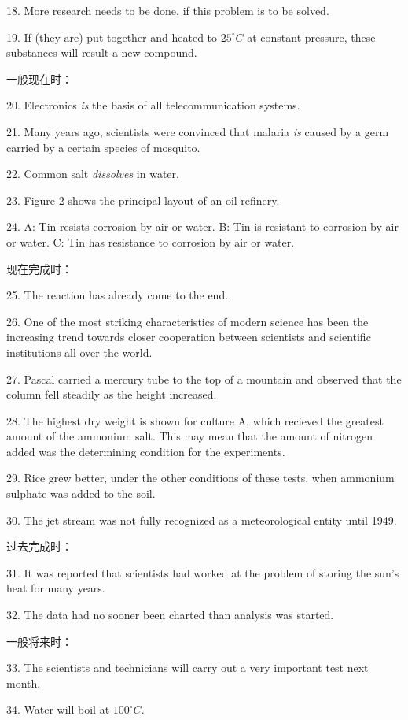 \documentclass[a4paper,twocolumn,10pt]{article}
\begin{document}
\begin{CJK}{UTF8}{gkai}
18. More research needs to be done, if this problem is to be solved.

19. If (they are) put together and heated to $25^\circ C$ at constant
pressure, these substances will result a new compound.

一般现在时：

20. Electronics \emph{is} the basis of all telecommunication systems.

21. Many years ago, scientists were convinced that malaria \emph{is} caused
by a germ carried by a certain species of mosquito.

22. Common salt \emph{dissolves} in water.

23. Figure 2 shows the principal layout of an oil refinery.

24. A: Tin resists corrosion by air or water. 
    B: Tin is resistant to corrosion by air or water.
    C: Tin has resistance to corrosion by air or water. 

现在完成时：

25. The reaction has already come to the end.

26. One of the most striking characteristics of modern science has been
the increasing trend towards closer cooperation between scientists and
scientific institutions all over the world.

27. Pascal carried a mercury tube to the top of a mountain and observed
that the column fell steadily as the height increased.

28. The highest dry weight is shown for culture A, which recieved the
greatest amount of the ammonium salt. This may mean that the amount of 
nitrogen added was the determining condition for the experiments.

29. Rice grew better, under the other conditions of these tests,
when ammonium sulphate was added to the soil.

30. The jet stream was not fully recognized as a meteorological
entity until 1949.

过去完成时：

31. It was reported that scientists had worked at the problem of 
storing the sun's heat for many years.

32. The data had no sooner been charted than analysis was started.

一般将来时：

33. The scientists and technicians will carry out a very important
test next month.

34. Water will boil at $100^\circ C$.


\end{CJK}
\end{document}
